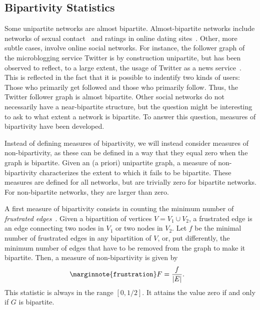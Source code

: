 \documentclass{article}
\begin{document}
\subsection{Bipartivity Statistics}
Some unipartite networks are almost bipartite.  Almost-bipartite
networks include networks of sexual contact~\cite{b719} and ratings in
online dating sites~\cite{b311,kunegis:split-complex-dating}.  Other,
more subtle cases, involve online social networks.  For instance, the
follower graph of the microblogging service Twitter is by construction
unipartite, but has been observed to reflect, to a large extent, the
usage of Twitter as a news service~\cite{b545}. This is reflected in the
fact that it is possible to indentify two kinds of users: Those who
primarily get followed and those who primarily follow.  Thus, the
Twitter follower graph is almost bipartite.  Other social networks do
not necessarily have a near-bipartite structure, but the question might
be interesting to ask to what extent a network is bipartite.  To answer
this question, measures of bipartivity have been developed.

Instead of defining measures of bipartivity, we will instead consider
measures of non-bipartivity, as these can be defined in a way that they
equal zero when the graph is bipartite.  Given an (a priori) unipartite
graph, a measure of non-bipartivity characterizes the extent to which it
fails to be bipartite.  These measures are defined for all networks, but
are trivially zero for bipartite networks.  For non-bipartite networks,
they are larger than zero.

A first measure of bipartivity consists in counting the minimum number
of \emph{frustrated edges}~\cite{b531}. Given a bipartition of vertices
$V=V_1\cup V_2$, a frustrated edge is an edge connecting two nodes in
$V_1$ or two nodes in $V_2$.  Let $f$ be the minimal number of
frustrated edges in any bipartition of $V$, or, put differently, the
minimum number of edges that have to be removed from the graph to make
it bipartite.  Then, a measure of non-bipartivity is given by
\begin{align}
  \marginnote{\texttt{frustration}} F &= \frac f {|E|}.
\end{align}
This statistic is always in the range $[0, 1/2]$.  It attains the value
zero if and only if $G$ is bipartite.
\end{document}
